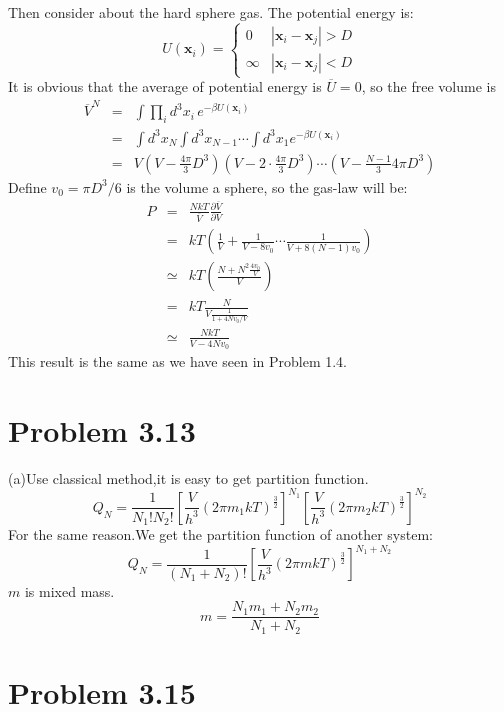 \documentclass{article}
\begin{document}
	Then consider about the hard sphere gas. The potential energy is:
	$$
	U(\mathbf{x}_i)=\left\{\begin{array}{ll}
	0 &|\mathbf{x}_i-\mathbf{x}_j| > D\\
	\infty &|\mathbf{x}_i-\mathbf{x}_j| < D
	\end{array}\right.
	$$
	It is obvious that the average of potential energy is $\overline{U} = 0$, so the free volume is
	\begin{eqnarray}
	\overline{V}^N&=&\int \prod_i d^3x_i\,e^{-\beta U(\mathbf{x}_i)}\nonumber\\
	&=&\int d^3x_N\int d^3x_{N-1}\cdots \int d^3x_1 e^{-\beta U(\mathbf{x}_i)}\nonumber\\
	&=&V\left(V-\frac{4\pi}{3}D^3\right)\left(V-2\cdot\frac{4\pi}{3}D^3\right)\cdots\left(V-\frac{N-1}{3}4\pi D^3\right)
	\end{eqnarray}
	Define $v_0 = \pi D^3/6$ is the volume a sphere, so the gas-law will be:
	\begin{eqnarray}
	P &=& \frac{NkT}{\overline{V}}\frac{\partial \overline{V}}{\partial V}\nonumber\\
	&=& kT\left(\frac{1}{V}+\frac{1}{V-8v_0}\cdots \frac{1}{V+8(N-1)v_0}\right)\nonumber\\
	&\simeq & kT\left(\frac{N+N^2\frac{4v_0}{V}}{V}\right)\nonumber\\
	&=& kT\frac{N}{V\frac{1}{1+4Nv_0/V}}\nonumber\\
	&\simeq &\frac{NkT}{V-4Nv_0}
	\end{eqnarray}
	This result is the same as we have seen in Problem 1.4.

\section*{Problem 3.13} %
\label{sec:problem_3_13}
	(a)Use classical method,it is easy to get partition function.
	$$Q_N=\frac{1}{N_1!N_2!}[\frac{V}{h^3}(2\pi m_1kT)^\frac{3}{2}]^{N_1}[\frac{V}{h^3}(2\pi m_2kT)^\frac{3}{2}]^{N_2}$$
	For the same reason.We get the partition function of another system:
	$$Q_N=\frac{1}{(N_1+N_2)!}[\frac{V}{h^3}(2\pi mkT)^\frac{3}{2}]^{N_1+N_2}$$
	$m$ is mixed mass.
	$$m=\frac{N_1m_1+N_2m_2}{N_1+N_2}$$


\section*{Problem 3.15} %
\label{sec:problem_3_15}
\end{document}
